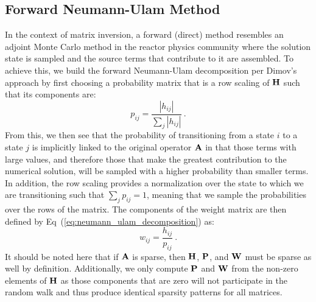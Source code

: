 \subsection{Forward Neumann-Ulam Method}
\label{sec:direct_mc}
In the context of matrix inversion, a forward (direct) method
resembles an adjoint Monte Carlo method in the reactor physics
community where the solution state is sampled and the source terms
that contribute to it are assembled. To achieve this, we build the
forward Neumann-Ulam decomposition per Dimov's approach by first
choosing a probability matrix that is a row scaling of $\mathbf{H}$ such
that its components are:
\begin{equation}
  p_{ij} = \frac{|h_{ij}|}{\sum_j |h_{ij}|}\:.
  \label{eq:direct_probability}
\end{equation}
From this, we then see that the probability of transitioning from a
state $i$ to a state $j$ is implicitly linked to the original operator
$\mathbf{A}$ in that those terms with large values, and therefore those
that make the greatest contribution to the numerical solution, will be
sampled with a higher probability than smaller terms. In addition, the
row scaling provides a normalization over the state to which we are
transitioning such that $\sum_j p_{ij} = 1$, meaning that we sample
the probabilities over the rows of the matrix. The components of
the weight matrix are then defined by
Eq~(\ref{eq:neumann_ulam_decomposition}) as:
\begin{equation}
  w_{ij} = \frac{h_{ij}}{p_{ij}}\:.
  \label{eq:direct_weight}
\end{equation}
It should be noted here that if $\mathbf{A}$ is sparse, then $\mathbf{H}$,
$\mathbf{P}$, and $\mathbf{W}$ must be sparse as well by
definition. Additionally, we only compute $\mathbf{P}$ and $\mathbf{W}$ from
the non-zero elements of $\mathbf{H}$ as those components that are zero
will not participate in the random walk and thus produce identical
sparsity patterns for all matrices.

